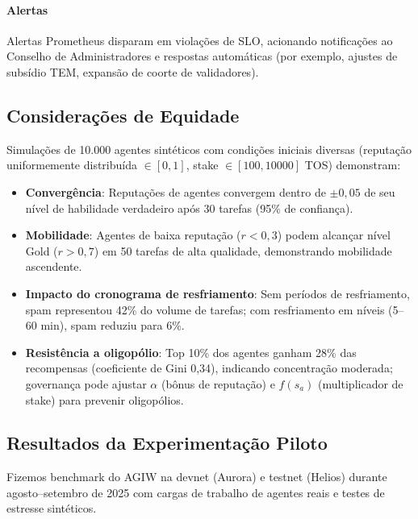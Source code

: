 \documentclass[11pt]{article}
\begin{document}
\paragraph{Alertas} Alertas Prometheus disparam em violações de SLO, acionando notificações ao Conselho de Administradores e respostas automáticas (por exemplo, ajustes de subsídio TEM, expansão de coorte de validadores).

\subsection{Considerações de Equidade}
Simulações de 10.000 agentes sintéticos com condições iniciais diversas (reputação uniformemente distribuída $\in [0,1]$, stake $\in [100, 10000]$ TOS) demonstram:
\begin{itemize}[noitemsep]
  \item \textbf{Convergência}: Reputações de agentes convergem dentro de $\pm0,05$ de seu nível de habilidade verdadeiro após 30 tarefas (95\% de confiança).
  \item \textbf{Mobilidade}: Agentes de baixa reputação ($r<0,3$) podem alcançar nível Gold ($r>0,7$) em 50 tarefas de alta qualidade, demonstrando mobilidade ascendente.
  \item \textbf{Impacto do cronograma de resfriamento}: Sem períodos de resfriamento, spam representou 42\% do volume de tarefas; com resfriamento em níveis (5--60 min), spam reduziu para 6\%.
  \item \textbf{Resistência a oligopólio}: Top 10\% dos agentes ganham 28\% das recompensas (coeficiente de Gini 0,34), indicando concentração moderada; governança pode ajustar $\alpha$ (bônus de reputação) e $f(s_a)$ (multiplicador de stake) para prevenir oligopólios.
\end{itemize}

\subsection{Resultados da Experimentação Piloto}
\label{sec:pilot-results}
Fizemos benchmark do AGIW na devnet (Aurora) e testnet (Helios) durante agosto--setembro de 2025 com cargas de trabalho de agentes reais e testes de estresse sintéticos.
\end{document}
